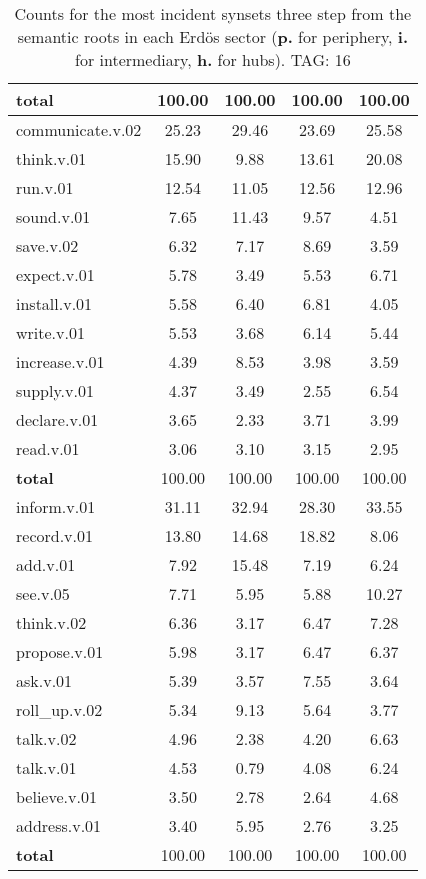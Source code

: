 \begin{table}[h!]
\begin{center}
\begin{tabular}{| l || c | c | c | c |}
{{\bf total}} & 100.00  & 100.00  & 100.00  & 100.00 \\\hline\hline\hline
communicate.v.02 & 25.23  & 29.46  & 23.69  & 25.58 \\\hline
think.v.01 & 15.90  & 9.88  & 13.61  & 20.08 \\\hline
run.v.01 & 12.54  & 11.05  & 12.56  & 12.96 \\\hline
sound.v.01 & 7.65  & 11.43  & 9.57  & 4.51 \\\hline
save.v.02 & 6.32  & 7.17  & 8.69  & 3.59 \\\hline
expect.v.01 & 5.78  & 3.49  & 5.53  & 6.71 \\\hline
install.v.01 & 5.58  & 6.40  & 6.81  & 4.05 \\\hline
write.v.01 & 5.53  & 3.68  & 6.14  & 5.44 \\\hline
increase.v.01 & 4.39  & 8.53  & 3.98  & 3.59 \\\hline
supply.v.01 & 4.37  & 3.49  & 2.55  & 6.54 \\\hline
declare.v.01 & 3.65  & 2.33  & 3.71  & 3.99 \\\hline
read.v.01 & 3.06  & 3.10  & 3.15  & 2.95 \\\hline\hline
{{\bf total}} & 100.00  & 100.00  & 100.00  & 100.00 \\\hline\hline\hline
inform.v.01 & 31.11  & 32.94  & 28.30  & 33.55 \\\hline
record.v.01 & 13.80  & 14.68  & 18.82  & 8.06 \\\hline
add.v.01 & 7.92  & 15.48  & 7.19  & 6.24 \\\hline
see.v.05 & 7.71  & 5.95  & 5.88  & 10.27 \\\hline
think.v.02 & 6.36  & 3.17  & 6.47  & 7.28 \\\hline
propose.v.01 & 5.98  & 3.17  & 6.47  & 6.37 \\\hline
ask.v.01 & 5.39  & 3.57  & 7.55  & 3.64 \\\hline
roll\_up.v.02 & 5.34  & 9.13  & 5.64  & 3.77 \\\hline
talk.v.02 & 4.96  & 2.38  & 4.20  & 6.63 \\\hline
talk.v.01 & 4.53  & 0.79  & 4.08  & 6.24 \\\hline
believe.v.01 & 3.50  & 2.78  & 2.64  & 4.68 \\\hline
address.v.01 & 3.40  & 5.95  & 2.76  & 3.25 \\\hline\hline
{{\bf total}} & 100.00  & 100.00  & 100.00  & 100.00 \\\hline
\end{tabular}
\caption{Counts for the most incident synsets three step from the semantic roots in each Erd\"os sector ({\bf p.} for periphery, {\bf i.} for intermediary, {\bf h.} for hubs). TAG: 16}
\end{center}
\end{table}